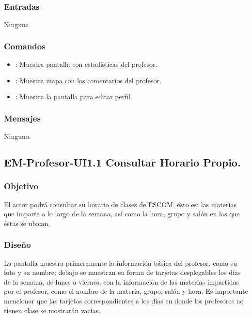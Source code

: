 \subsubsection{Entradas}
	\noindent
	Ninguna

\subsubsection{Comandos}
	\begin{itemize}
		\item {}: Muestra pantalla con estadísticas del profesor.
		\item {}: Muestra mapa con los comentarios del profesor.
		\item {}: Muestra la pantalla para editar perfil.
	\end{itemize}

\subsubsection{Mensajes}
	\noindent
	Ninguno.

\subsection{EM-Profesor-UI1.1 Consultar Horario Propio.}

\subsubsection{Objetivo}
	\noindent
	El actor podrá consultar su horario de clases de ESCOM, ésto es: las materias que imparte a lo largo de la semana, así como la hora, grupo y salón en las que éstas se ubican.


\subsubsection{Diseño}
	\noindent
	La pantalla muestra primeramente la información básica del profesor, como su foto y su nombre; debajo se muestran en forma de tarjetas desplegables los días de la semana, de lunes a viernes, con la información de las materias impartidas por el profesor, como el nombre de la materia, grupo, salón y hora. Es importante mencionar que las tarjetas correspondientes a los días en donde los profesores no tienen clase se mostrarán vacías.


